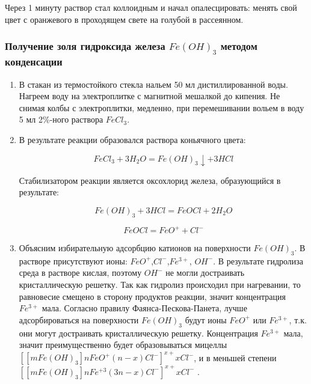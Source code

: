 \documentclass[a4paper,12pt]{article}
\begin{document}
Через 1 минуту раствор стал коллоидным и начал опалесцировать: менять свой цвет с оранжевого в проходящем свете на голубой в рассеянном.

\subsubsection{Получение золя гидроксида железа $Fe(OH)_3$ методом конденсации}
\begin{enumerate}
    \item В стакан из термостойкого стекла нальем 50 мл дистиллированной воды. Нагреем воду на электроплитке с магнитной мешалкой до кипения. Не снимая колбы с электроплитки, медленно, при перемешивании вольем в воду 5 мл 2\%-ного раствора $FeCl_3$.
    \item В результате реакции образовался раствора коньячного цвета: 

\[FeCl_3 + 3H_2O = Fe(OH)_3 \downarrow+3HCl\]

Стабилизатором реакции является оксохлорид железа, образующийся в результате:

\[Fe(OH)_3 + 3HCl = FeOCl + 2H_2O\]

\[FeOCl=FeO^{+}+Cl^{-}\]

\item  Объясним избирательную адсорбцию катионов на поверхности $Fe(OH)_3$. В растворе присутствуют ионы: $FeO^{+}$,$Cl^{ -}$,$Fe^{3+}$, $OH^{-}$. В результате гидролиза среда в растворе кислая, поэтому $OH^{-}$ не могли достраивать кристаллическую решетку. Так как гидролиз происходил при нагревании, то равновесие смещено в сторону продуктов реакции, значит концентрация $Fe^{3+}$ мала. Согласно правилу Фаянса-Пескова-Панета, лучше адсорбироваться на поверхности  $Fe(OH)_3$ будут ионы $FeO^{+}$ или $Fe^{3+}$, т.к. они могут достраивать кристаллическую решетку. Концентрация $Fe^{3+}$ мала, значит преимущественно будет образовываться мицеллы
$[[mFe(OH)_3]n FeO^{+} (n-x) Cl^{-}]^{x+} xCl^{-}$, и в меньшей степени $[[mFe(OH)_3]n Fe^{+3} (3n-x) Cl^{-}]^{x+} xCl^{-}$ . 


\end{enumerate}
 
\end{document}
